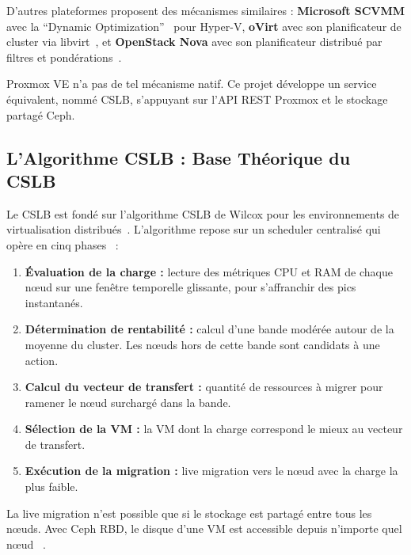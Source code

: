 \par D'autres plateformes proposent des mécanismes similaires : \textbf{Microsoft SCVMM} avec la ``Dynamic Optimization''~\cite{refSCVMM} pour Hyper-V, \textbf{oVirt} avec son planificateur de cluster via libvirt~\cite{refOvirt}, et \textbf{OpenStack Nova} avec son planificateur distribué par filtres et pondérations~\cite{refNova}. \\

\par Proxmox VE n'a pas de tel mécanisme natif. Ce projet développe un service équivalent, nommé CSLB, s'appuyant sur l'API REST Proxmox et le stockage partagé Ceph. \\

\subsection{L'Algorithme CSLB : Base Théorique du CSLB}

\par Le CSLB est fondé sur l'algorithme CSLB de Wilcox pour les environnements de virtualisation distribués~\cite{ref38}. L'algorithme repose sur un scheduler centralisé qui opère en cinq phases~\cite{ref17} :\\

\begin{enumerate}
    \item \textbf{Évaluation de la charge :} lecture des métriques CPU et RAM de chaque n\oe{}ud sur une fenêtre temporelle glissante, pour s'affranchir des pics instantanés.
    \item \textbf{Détermination de rentabilité :} calcul d'une bande modérée autour de la moyenne du cluster. Les n\oe{}uds hors de cette bande sont candidats à une action.
    \item \textbf{Calcul du vecteur de transfert :} quantité de ressources à migrer pour ramener le n\oe{}ud surchargé dans la bande.
    \item \textbf{Sélection de la VM :} la VM dont la charge correspond le mieux au vecteur de transfert.
    \item \textbf{Exécution de la migration :} live migration vers le n\oe{}ud avec la charge la plus faible.
\end{enumerate}

\par La live migration n'est possible que si le stockage est partagé entre tous les n\oe{}uds. Avec Ceph RBD, le disque d'une VM est accessible depuis n'importe quel n\oe{}ud ~\cite{ref14}.


